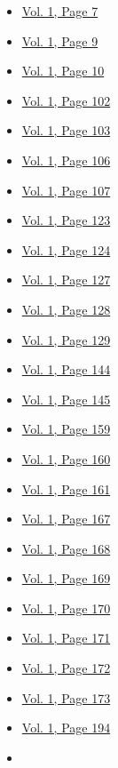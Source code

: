 \begin{itemize}
  \begin{itemize}
  \tightlist
  \item
    \protect\hyperlink{g-page-15}{Vol. 1, Page 7}
  \item
    \protect\hyperlink{g-page-17}{Vol. 1, Page 9}
  \item
    \protect\hyperlink{g-page-18}{Vol. 1, Page 10}
  \item
    \protect\hyperlink{g-page-110}{Vol. 1, Page 102}
  \item
    \protect\hyperlink{g-page-111}{Vol. 1, Page 103}
  \item
    \protect\hyperlink{g-page-114}{Vol. 1, Page 106}
  \item
    \protect\hyperlink{g-page-115}{Vol. 1, Page 107}
  \item
    \protect\hyperlink{g-page-131}{Vol. 1, Page 123}
  \item
    \protect\hyperlink{g-page-132}{Vol. 1, Page 124}
  \item
    \protect\hyperlink{g-page-135}{Vol. 1, Page 127}
  \item
    \protect\hyperlink{g-page-136}{Vol. 1, Page 128}
  \item
    \protect\hyperlink{g-page-137}{Vol. 1, Page 129}
  \item
    \protect\hyperlink{g-page-152}{Vol. 1, Page 144}
  \item
    \protect\hyperlink{g-page-153}{Vol. 1, Page 145}
  \item
    \protect\hyperlink{g-page-167}{Vol. 1, Page 159}
  \item
    \protect\hyperlink{g-page-168}{Vol. 1, Page 160}
  \item
    \protect\hyperlink{g-page-169}{Vol. 1, Page 161}
  \item
    \protect\hyperlink{g-page-175}{Vol. 1, Page 167}
  \item
    \protect\hyperlink{g-page-176}{Vol. 1, Page 168}
  \item
    \protect\hyperlink{g-page-177}{Vol. 1, Page 169}
  \item
    \protect\hyperlink{g-page-178}{Vol. 1, Page 170}
  \item
    \protect\hyperlink{g-page-179}{Vol. 1, Page 171}
  \item
    \protect\hyperlink{g-page-180}{Vol. 1, Page 172}
  \item
    \protect\hyperlink{g-page-181}{Vol. 1, Page 173}
  \item
    \protect\hyperlink{g-page-202}{Vol. 1, Page 194}
  \item

\end{itemize}
\end{itemize}
